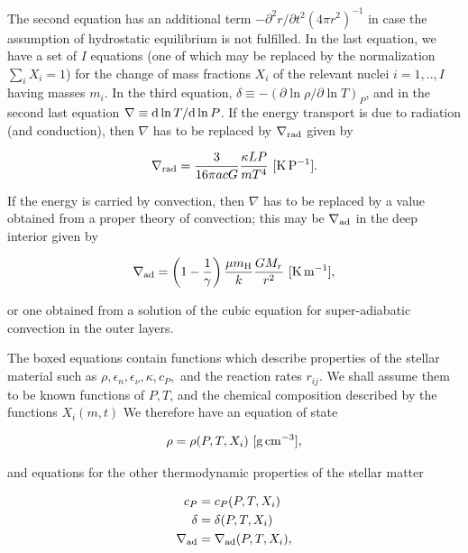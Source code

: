 \documentclass[a4paper,10pt]{article}
\begin{document}
{\noindent}The second equation has an additional term $-\partial^2r/\partial t^2(4\pi r^2)^{-1}$ in case the assumption of hydrostatic equilibrium is not fulfilled. In the last equation, we have a set of $I$ equations (one of which may be replaced by the normalization $\sum_iX_i=1$) for the change of mass fractions $X_i$ of the relevant nuclei $i=1,..,I$ having masses $m_i$. In the third equation, $\delta\equiv-(\partial\ln\rho/\partial\ln T)_P$, and in the second last equation $\nabla\equiv{\rm d}\ln T/{\rm d}\ln P$. If the energy transport is due to radiation (and conduction), then $\nabla$ has to be replaced by $\nabla_{\rm rad}$ given by 

\begin{align*}
    \nabla_{\rm rad} = \frac{3}{16\pi acG}\frac{\kappa LP}{mT^4} ~ [{\rm K\,P^{-1}}].
\end{align*}

{\noindent}If the energy is carried by convection, then $\nabla$ has to be replaced by a value obtained from a proper theory of convection; this may be $\nabla_{\rm ad}$ in the deep interior given by 

\begin{align*}
    \nabla_{\rm ad} = \left(1-\frac{1}{\gamma}\right) \frac{\mu m_{\rm H}}{k}\frac{GM_r}{r^2} ~ [{\rm K\,m^{-1}}],
\end{align*}

{\noindent}or one obtained from a solution of the cubic equation for super-adiabatic convection in the outer layers.

{\noindent}The boxed equations contain functions which describe properties of the stellar material such as $\rho, \epsilon_n, \epsilon_\nu,\kappa,c_P,$ and the reaction rates $r_{ij}$. We shall assume them to be known functions of $P, T$, and the chemical composition described by the functions $X_i(m,t)$ We therefore have an equation of state

\begin{align*}
    \rho = \rho(P,T,X_i) ~ [{\rm g\,cm^{-3}}],
\end{align*}

{\noindent}and equations for the other thermodynamic properties of the stellar matter

\begin{align*}
    c_P &= c_P (P,T,X_i) \\
    \delta &= \delta (P,T,X_i) \\
    \nabla_{\rm ad} &= \nabla_{\rm ad} (P,T,X_i),
\end{align*}
\end{document}
